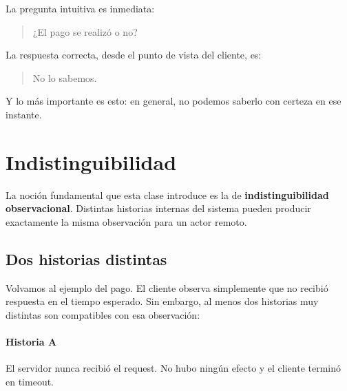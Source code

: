 \documentclass[variant=apuntes,cover=institutional,mode=screen]{ua-engineering-v6-article}
\begin{document}
\begin{center}
\end{center}

La pregunta intuitiva es inmediata:

\begin{quote}
¿El pago se realizó o no?
\end{quote}

La respuesta correcta, desde el punto de vista del cliente, es:

\begin{quote}
No lo sabemos.
\end{quote}

Y lo más importante es esto: en general, no podemos saberlo con certeza en ese instante.

\section{Indistinguibilidad}\label{sec:indistinguibilidad}

La noción fundamental que esta clase introduce es la de \textbf{indistinguibilidad observacional}.
Distintas historias internas del sistema pueden producir exactamente la misma observación para un actor remoto.

\subsection{Dos historias distintas}\label{subsec:dos-historias-distintas}

Volvamos al ejemplo del pago.
El cliente observa simplemente que no recibió respuesta en el tiempo esperado.
Sin embargo, al menos dos historias muy distintas son compatibles con esa observación:

\paragraph{Historia A}
El servidor nunca recibió el request.
No hubo ningún efecto y el cliente terminó en timeout.
\end{document}
